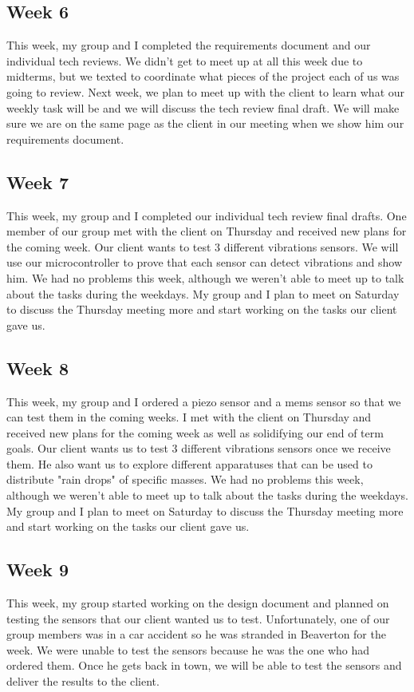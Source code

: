 \documentclass[letterpaper,10pt,draftclsnofoot,onecolumn]{article}
\begin{document}
\subsection{Week 6}
This week, my group and I completed the requirements document and our individual tech reviews. We didn't get to meet up at all this week due to midterms, but we texted to coordinate what pieces of the project each of us was going to review. Next week, we plan to meet up with the client to learn what our weekly task will be and we will discuss the tech review final draft. We will make sure we are on the same page as the client in our meeting when we show him our requirements document.
\subsection{Week 7}
This week, my group and I completed our individual tech review final drafts.  One member of our group met with the client on Thursday and received new plans for the coming week. Our client wants to test 3 different vibrations sensors. We will use our microcontroller to prove that each sensor can detect vibrations and show him. We had no problems this week, although we weren't able to meet up to talk about the tasks during the weekdays. My group and I plan to meet on Saturday to discuss the Thursday meeting more and start working on the tasks our client gave us.
 
\subsection{Week 8}
This week, my group and I ordered a piezo sensor and a mems sensor so that we can test them in the coming weeks.  I met with the client on Thursday and received new plans for the coming week as well as solidifying our end of term goals. Our client wants us to test 3 different vibrations sensors once we receive them. He also want us to explore different apparatuses that can be used to distribute "rain drops" of specific masses. We had no problems this week, although we weren't able to meet up to talk about the tasks during the weekdays. My group and I plan to meet on Saturday to discuss the Thursday meeting more and start working on the tasks our client gave us.

\subsection{Week 9}
This week, my group started working on the design document and planned on testing the sensors that our client wanted us to test. Unfortunately, one of our group members was in a car accident so he was stranded in Beaverton for the week. We were unable to test the sensors because he was the one who had ordered them. Once he gets back in town, we will be able to test the sensors and deliver the results to the client.
 
\end{document}
